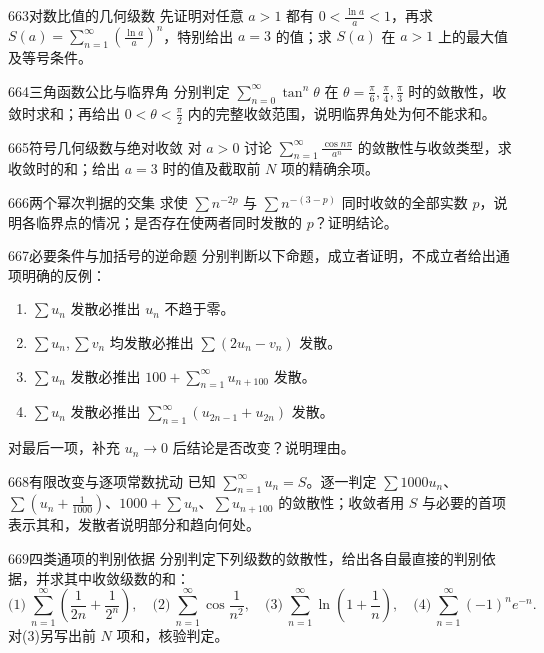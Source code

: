 \begin{exercise}{663}{对数比值的几何级数}
先证明对任意 $a>1$ 都有 $0<\frac{\ln a}{a}<1$，再求 $S(a)=\sum_{n=1}^{\infty}(\frac{\ln a}{a})^n$，特别给出 $a=3$ 的值；求 $S(a)$ 在 $a>1$ 上的最大值及等号条件。
\end{exercise}
\begin{exercise}{664}{三角函数公比与临界角}
分别判定 $\sum_{n=0}^{\infty}\tan^n\theta$ 在 $\theta=\frac\pi6,\frac\pi4,\frac\pi3$ 时的敛散性，收敛时求和；再给出 $0<\theta<\frac\pi2$ 内的完整收敛范围，说明临界角处为何不能求和。
\end{exercise}
\begin{exercise}{665}{符号几何级数与绝对收敛}
对 $a>0$ 讨论 $\sum_{n=1}^{\infty}\frac{\cos n\pi}{a^n}$ 的敛散性与收敛类型，求收敛时的和；给出 $a=3$ 时的值及截取前 $N$ 项的精确余项。
\end{exercise}
\begin{exercise}{666}{两个幂次判据的交集}
求使 $\sum n^{-2p}$ 与 $\sum n^{-(3-p)}$ 同时收敛的全部实数 $p$，说明各临界点的情况；是否存在使两者同时发散的 $p$？证明结论。
\end{exercise}
\begin{exercise}{667}{必要条件与加括号的逆命题}
分别判断以下命题，成立者证明，不成立者给出通项明确的反例：
\begin{enumerate}
\item $\sum u_n$ 发散必推出 $u_n$ 不趋于零。
\item $\sum u_n,\sum v_n$ 均发散必推出 $\sum(2u_n-v_n)$ 发散。
\item $\sum u_n$ 发散必推出 $100+\sum_{n=1}^{\infty}u_{n+100}$ 发散。
\item $\sum u_n$ 发散必推出 $\sum_{n=1}^{\infty}(u_{2n-1}+u_{2n})$ 发散。
\end{enumerate}
对最后一项，补充 $u_n\to0$ 后结论是否改变？说明理由。
\end{exercise}
\begin{exercise}{668}{有限改变与逐项常数扰动}
已知 $\sum_{n=1}^{\infty}u_n=S$。逐一判定 $\sum1000u_n$、$\sum(u_n+\frac1{1000})$、$1000+\sum u_n$、$\sum u_{n+100}$ 的敛散性；收敛者用 $S$ 与必要的首项表示其和，发散者说明部分和趋向何处。
\end{exercise}
\begin{exercise}{669}{四类通项的判别依据}
分别判定下列级数的敛散性，给出各自最直接的判别依据，并求其中收敛级数的和：
\[\text{(1)}\ \sum_{n=1}^{\infty}\left(\frac1{2n}+\frac1{2^n}\right),\quad
\text{(2)}\ \sum_{n=1}^{\infty}\cos\frac1{n^2},\quad
\text{(3)}\ \sum_{n=1}^{\infty}\ln\left(1+\frac1n\right),\quad
\text{(4)}\ \sum_{n=1}^{\infty}(-1)^ne^{-n}.\]
对(3)另写出前 $N$ 项和，核验判定。
\end{exercise}

